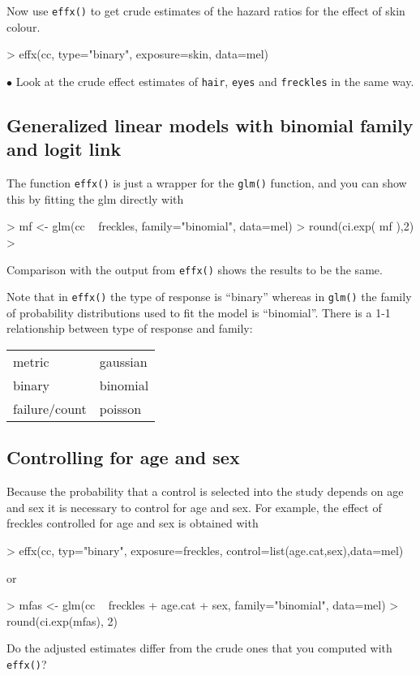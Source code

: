 Now use \texttt{effx()} to get crude estimates of the hazard ratios for the effect of skin colour. 
\begin{Schunk}
\begin{Sinput}
> effx(cc, type="binary", exposure=skin, data=mel)
\end{Sinput}
\end{Schunk}


\medskip
$\bullet$ Look at the crude effect estimates of {\tt hair}, {\tt eyes} and 
{\tt freckles} in the same way.

\subsection{Generalized linear models with binomial family and logit link}


The function {\tt effx()} is just a wrapper for the {\tt glm()} function, and you can show this by fitting the glm directly with
\begin{Schunk}
\begin{Sinput}
> mf <- glm(cc ~ freckles, family="binomial", data=mel)
> round(ci.exp( mf ),2)
> 
\end{Sinput}
\end{Schunk}
Comparison with the output from {\tt effx()} shows the results to be the same. 

Note that in {\tt effx()} the type of response is ``binary'' whereas in {\tt glm()} the family of probability distributions used to fit the model is ``binomial''. There is a 1-1 relationship between type of response and family:

\begin{tabular}{ll}
metric & gaussian \\
binary & binomial\\
failure/count & poisson
\end{tabular}
\subsection{Controlling for age and sex}
Because the probability that a control is selected into the study depends on age and sex it is necessary to control for age and sex. For example, the effect of freckles controlled for age and sex is obtained with
\begin{Schunk}
\begin{Sinput}
> effx(cc, typ="binary", exposure=freckles, control=list(age.cat,sex),data=mel)
\end{Sinput}
\end{Schunk}
or
\begin{Schunk}
\begin{Sinput}
> mfas <- glm(cc ~ freckles + age.cat + sex, family="binomial", data=mel)
> round(ci.exp(mfas), 2)
\end{Sinput}
\end{Schunk}
Do the adjusted estimates differ from the crude ones
 that you computed with \texttt{effx()}?

